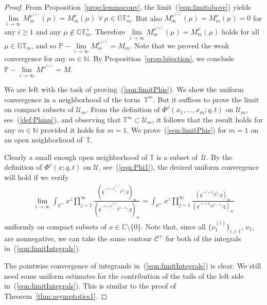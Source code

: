 \documentclass[pdftex]{sigma}
\numberwithin{equation}{section}
\newcommand{\C}{\mathbb{C}}
\newcommand{\N}{\mathbb{N}}
\newcommand{\U}{\mathcal{U}}
\newcommand{\CC}{\mathcal{C}}
\newcommand{\GT}{\mathbb{GT}}
\newcommand{\GTp}{\mathbb{GT}^+}
\newcommand{\TT}{\mathbb{T}}
\begin{document}
\begin{proof}
From Proposition~\ref{prop:lemmaconv}, the limit~(\ref{eqn:limitabove}) yields $\lim\limits_{i\rightarrow\infty}{M_m^{\nu^{(i)}}(\mu)} = M_m^{\nu}(\mu)$ $\forall\, \mu\in\GTp_m$. But also $M^{\nu^{(i)}}_m(\mu) = M_m^{\nu}(\mu) = 0$ for any $i\geq 1$ and any $\mu\notin\GTp_m$.
Therefore $\lim\limits_{i\rightarrow\infty}{M_m^{\nu^{(i)}}(\mu)} = M_m^{\nu}(\mu)$ holds for all $\mu\in\GT_m$, and so $\mathbb{P}-\lim\limits_{i\rightarrow\infty}{M^{\nu^{(i)}}_m} = M_m$. Note that we proved the weak convergence for any $m\in\N$. By Proposition~\ref{prop:bijection}, we conclude $\mathbb{P}-\lim\limits_{i\rightarrow\infty}{M^{\nu^{(i)}}} = M$.

We are left with the task of proving~(\ref{eqn:limitPhis}).
We show the uniform convergence in a neighborhood of the torus~$\TT^m$.
But it suf\/f\/ices to prove the limit on compact subsets of $\U_m$.
From the def\/inition of $\Phi^{\nu}(x_1, \dots, x_m; q, t)$ on $\U_m$, see~(\ref{def:Phinu}), and observing that $\TT^m\subset\U_m$, it follows that the result holds for any $m\in\N$ provided it holds for $m = 1$.
We prove~(\ref{eqn:limitPhis}) for $m = 1$ on an open neighborhood of~$\TT$.

Clearly a small enough open neighborhood of $\TT$ is a subset of~$\U$.
By the def\/inition of $\Phi^{\nu}(x; q, t)$ on $\U$, see~(\ref{eqn:Phi1}), the desired uniform convergence will hold if we verify
\begin{gather}\label{eqn:limitIntegrals}
\lim_{i\rightarrow\infty}{ \int_{\CC^+} {x^z\prod_{j=1}^{\infty}{\frac{(q^{-z+\nu_j^{(i)}}t^j; q)_{\infty}}{(q^{-z+\nu_j^{(i)}}t^{j-1}; q)_{\infty}}} } }= \int_{\CC^+} {x^z\prod_{j=1}^{\infty}{\frac{(q^{-z+\nu_j}t^j; q)_{\infty}}{(q^{-z+\nu_j}t^{j-1}; q)_{\infty}}} }
\end{gather}
uniformly on compact subsets of $x\in\C\setminus\{0\}$. Note that, since all $\big\{\nu^{(i)}_1\big\}_{i\geq 1}$, $\nu_1$, are nonnegative, we can take the same contour $\CC^+$ for both of the integrals in~(\ref{eqn:limitIntegrals}).

The pointwise convergence of integrands in~(\ref{eqn:limitIntegrals}) is clear. We still need some uniform estimates for the contribution of the tails of the left side in~(\ref{eqn:limitIntegrals}). This is similar to the proof of Theorem~\ref{thm:asymptotics1}.


\end{proof}
\end{document}
